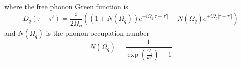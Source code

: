 where the free phonon Green function is
\begin{equation}
    D_q(\tau - \tau') = \frac{i}{2 \Omega_q} \left( (1 + N(\Omega_q)) e^{-i \Omega_q |\tau - \tau'|} + N(\Omega_q) e^{+i \Omega_q |\tau - \tau'|} \right)
\end{equation}
and $N(\Omega_q)$ is the phonon occupation number
\begin{equation}
    N(\Omega_q) = \frac{1}{\exp \left( \frac{\Omega_q}{k T} \right) - 1}
\end{equation}
